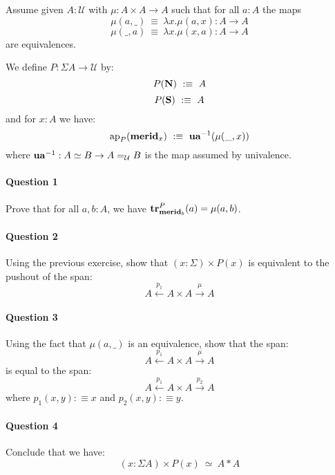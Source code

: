 \documentclass{article}[6pt]%
\newcommand{\U}{{\mathcal U}}
\renewcommand{\r}{\rightarrow}
\newcommand{\Gl}{\lambda}
\newcommand{\ap}{\mathrm{ap}}
\newcommand{\tr}{\mathrm{\bf tr}}
\newcommand{\ua}{\mathrm{\bf ua}}
\newcommand{\N}{\mathrm{\bf N}}
\renewcommand{\S}{\mathrm{\bf S}}
\newcommand{\merid}{\mathrm{\bf merid}}
\begin{document}
\begin{Exercise}[title={The Hopf construction}]
Assume given $A:\U$ with $\mu : A\times A \r A$ such that for all $a:A$ the maps
\[\mu(a,\_) \ \equiv\ \Gl x.\mu(a,x) : A\r A\]
\[\mu(\_,a) \ \equiv\ \Gl x.\mu(x,a):A\r A\] 
are equivalences.

We define $P:\Sigma A\r \U$ by:
\[P(\N) \ :\equiv\ A\]
\[P(\S) \ :\equiv\ A\]
and for $x:A$ we have:
\[\ap_P(\merid_x) \ :\equiv\ \ua^{-1}(\mu(\_,x))\]
where $\ua^{-1} : A\simeq B \r A=_\U B$ is the map assumed by univalence.

\paragraph{Question 1} Prove that for all $a,b:A$, we have $\tr^P_{\merid_b}(a) = \mu(a,b)$.

\paragraph{Question 2} Using the previous exercise, show that $(x:\Sigma)\times P(x)$ is equivalent to the pushout of the span:
\[ A \overset{p_1}{\leftarrow} A\times A \overset{\mu}{\r} A\]

\paragraph{Question 3} Using the fact that $\mu(a,\_)$ is an equivalence, show that the span:
\[ A \overset{p_1}{\leftarrow} A\times A \overset{\mu}{\r} A\]
is equal to the span:
\[ A \overset{p_1}{\leftarrow} A\times A \overset{p_2}{\r} A\]
where $p_1(x,y):\equiv x$ and $p_2(x,y):\equiv y$.

\paragraph{Question 4} Conclude that we have:
\[(x:\Sigma A) \times P(x) \ \simeq\ A\ast A\]


\end{Exercise}
\end{document}
